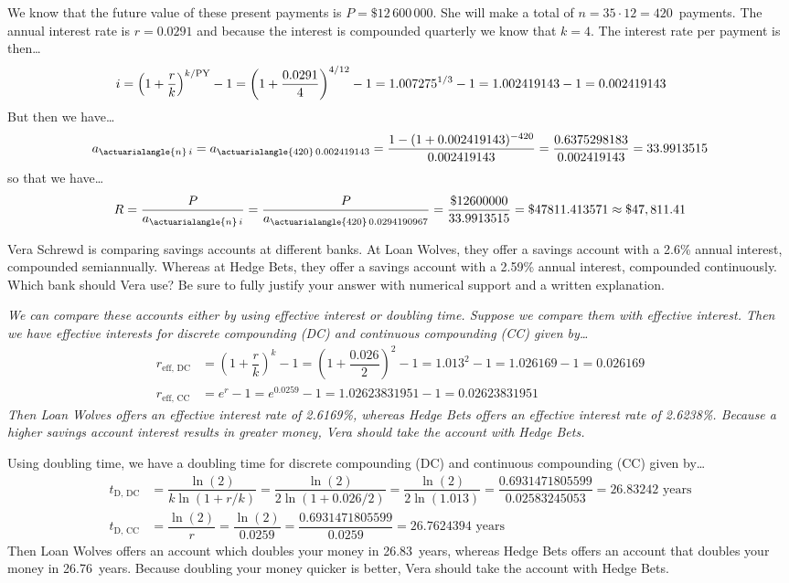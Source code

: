 \documentclass[12pt,letterpaper]{exam}
\begin{document}
\begin{questions}
{We know that the future value of these present payments is $P= \$12\,600\,000$. She will make a total of $n= 35 \cdot 12= 420$~payments. The annual interest rate is $r= 0.0291$ and because the interest is compounded quarterly we know that $k= 4$. The interest rate per payment is then\dots
	\[
	\hspace{-0.5cm} i= \left(1 + \dfrac{r}{k} \right)^{k/\text{PY}} - 1= \left(1 + \dfrac{0.0291}{4} \right)^{4/12} - 1= 1.007275^{1/3} - 1= 1.002419143 - 1= 0.002419143
	\]
But then we have\dots
	\[
	a_{\actuarialangle{n}\,i}= a_{\actuarialangle{420}\,0.002419143}= \dfrac{1 - (1 + 0.002419143)^{-420}}{0.002419143}= \dfrac{0.6375298183}{0.002419143}= 33.9913515
	\]
so that we have\dots
	\[
	R= \dfrac{P}{a_{\actuarialangle{n}\,i}}= \dfrac{P}{a_{\actuarialangle{420}\,0.0294190967}}= \dfrac{\$12600000}{33.9913515}= \$47811.413571 \approx \$47,811.41
	\]
}



\newpage
\question[10] Vera Schrewd is comparing savings accounts at different banks. At Loan Wolves, they offer a savings account with a 2.6\% annual interest, compounded semiannually. Whereas at Hedge Bets, they offer a savings account with a 2.59\% annual interest, compounded continuously. Which bank should Vera use? Be sure to fully justify your answer with numerical support and a written explanation. \pspace

{\itshape
\sol We can compare these accounts either by using effective interest or doubling time. Suppose we compare them with effective interest. Then we have effective interests for discrete compounding (DC) and continuous compounding (CC) given by\dots
	\[
	\begin{aligned}
	r_{\text{eff, DC}}&= \left(1 + \dfrac{r}{k} \right)^k - 1= \left(1 + \dfrac{0.026}{2} \right)^2 - 1= 1.013^2 - 1= 1.026169 - 1= 0.026169 \\[0.3cm]
	r_{\text{eff, CC}}&= e^r - 1= e^{0.0259} - 1= 1.02623831951 - 1= 0.02623831951
	\end{aligned}
	\]
Then Loan Wolves offers an effective interest rate of 2.6169\%, whereas Hedge Bets offers an effective interest rate of 2.6238\%. Because a higher savings account interest results in greater money, Vera should take the account with Hedge Bets. \pspace

Using doubling time, we have a doubling time for discrete compounding (DC) and continuous compounding (CC) given by\dots
	\[
	\begin{aligned}
	t_{\text{D, DC}}&= \dfrac{\ln(2)}{k \ln(1 + r/k)}= \dfrac{\ln(2)}{2 \ln(1 + 0.026/2)}= \dfrac{\ln(2)}{2 \ln(1.013)}= \dfrac{0.6931471805599}{0.02583245053}= 26.83242 \text{ years} \\[0.3cm]
	t_{\text{D, CC}}&= \dfrac{\ln(2)}{r}= \dfrac{\ln(2)}{0.0259}= \dfrac{0.6931471805599}{0.0259}= 26.7624394 \text{ years}
	\end{aligned}
	\]
Then Loan Wolves offers an account which doubles your money in 26.83~years, whereas Hedge Bets offers an account that doubles your money in 26.76~years. Because doubling your money quicker is better, Vera should take the account with Hedge Bets. 
}




\end{questions}
\end{document}
